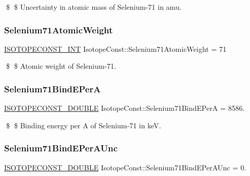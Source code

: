 \$ \$ Uncertainty in atomic mass of Selenium-\/71 in amu. \mbox{\label{group___isotope_const-_selenium-_se71_gaf055c77bc480f35d683cbb3a92d636a9}} 
\subsubsection{\texorpdfstring{Selenium71\+Atomic\+Weight}{Selenium71AtomicWeight}}
{\footnotesize\ttfamily \mbox{\hyperlink{group___isotope_const-_macros_ga5f18360b3e99483a35c32d789e62621c}{I\+S\+O\+T\+O\+P\+E\+C\+O\+N\+S\+T\+\_\+\+I\+NT}} Isotope\+Const\+::\+Selenium71\+Atomic\+Weight = 71}

\$ \$ Atomic weight of Selenium-\/71. \mbox{\label{group___isotope_const-_selenium-_se71_ga7f3265722a8dbfae931cba9c9d99c195}} 
\subsubsection{\texorpdfstring{Selenium71\+Bind\+E\+PerA}{Selenium71BindEPerA}}
{\footnotesize\ttfamily \mbox{\hyperlink{group___isotope_const-_macros_ga8f45a7272ce02c0b4c65c44636ed719a}{I\+S\+O\+T\+O\+P\+E\+C\+O\+N\+S\+T\+\_\+\+D\+O\+U\+B\+LE}} Isotope\+Const\+::\+Selenium71\+Bind\+E\+PerA = 8586.}

\$ \$ Binding energy per A of Selenium-\/71 in keV. \mbox{\label{group___isotope_const-_selenium-_se71_ga463e60a1b445aa1572b47da136808a48}} 
\subsubsection{\texorpdfstring{Selenium71\+Bind\+E\+Per\+A\+Unc}{Selenium71BindEPerAUnc}}
{\footnotesize\ttfamily \mbox{\hyperlink{group___isotope_const-_macros_ga8f45a7272ce02c0b4c65c44636ed719a}{I\+S\+O\+T\+O\+P\+E\+C\+O\+N\+S\+T\+\_\+\+D\+O\+U\+B\+LE}} Isotope\+Const\+::\+Selenium71\+Bind\+E\+Per\+A\+Unc = 0.}

